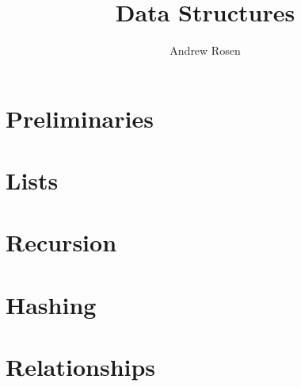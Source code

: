 \documentclass[10pt,a4paper]{book}
\begin{document}
\title{Data Structures}
\author{Andrew Rosen}
\date{}
\maketitle
\tableofcontents

\part{Preliminaries}





\part{Lists}
\label{part-list}





\part{Recursion}





\part{Hashing}






\part{Relationships}








\end{document}

